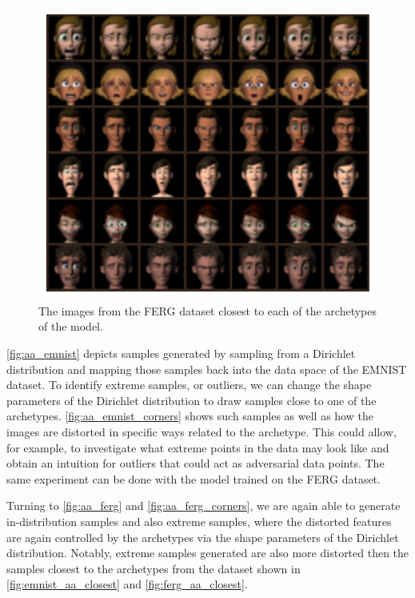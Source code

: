 \begin{figure}[htpb]
	\centering
	\includegraphics{figures/samples/archetypes_ferg_7.pdf}
	\caption{The images from the FERG dataset closest to each of the
		archetypes of the model.}%
	\label{fig:ferg_aa_closest}
\end{figure}

\autoref{fig:aa_emnist} depicts samples generated by sampling from a
Dirichlet distribution and mapping those samples back into the data space of
the EMNIST dataset. To identify extreme samples, or outliers, we can
change the shape parameters of the Dirichlet distribution to draw samples close
to one of the archetypes. \autoref{fig:aa_emnist_corners} shows such samples as
well as how the images are distorted in specific ways
related to the archetype. This could allow, for example, to investigate what
extreme points in the data may look like and obtain an intuition for outliers
that could act as adversarial data points.
The same experiment can be done with the model trained on the FERG dataset.

Turning to \autoref{fig:aa_ferg} and \autoref{fig:aa_ferg_corners}, we
are again able to generate in-distribution samples and also extreme samples,
where the distorted features are again controlled by the archetypes via the
shape parameters of the Dirichlet distribution. Notably, extreme samples
generated are also more distorted then the samples closest to the archetypes
from the dataset shown in \autoref{fig:emnist_aa_closest} and
\autoref{fig:ferg_aa_closest}.

